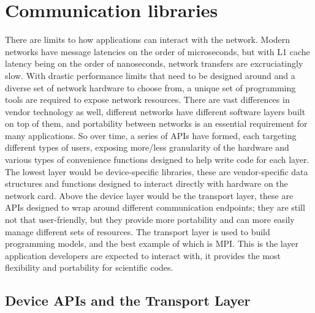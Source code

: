 \section{Communication libraries} 

There are limits to how applications can interact with the network.
Modern networks have message latencies on the order of microseconds, but with L1 cache latency being on the order of nanoseconds, network transfers are excruciatingly slow.
With drastic performance limits that need to be designed around and a diverse set of network hardware to choose from, a unique set of programming tools are required to expose network resources. 
There are vast differences in vendor technology as well, different networks have different software layers built on top of them, and portability between networks is an essential requirement for many applications. 
So over time, a series of APIs have formed, each targeting different types of users, exposing more/less granularity of the hardware and various types of convenience functions designed to help write code for each layer.
The lowest layer would be device-specific libraries, these are vendor-specific data structures and functions designed to interact directly with hardware on the network card.
Above the device layer would be the transport layer, these are APIs designed to wrap around different communication endpoints; they are still not that user-friendly, but they provide more portability and can more easily manage different sets of resources.
The transport layer is used to build programming models, and the best example of which is MPI. This is the layer application developers are expected to interact with, it provides the most flexibility and portability for scientific codes.

\subsection{Device APIs and the Transport Layer}

